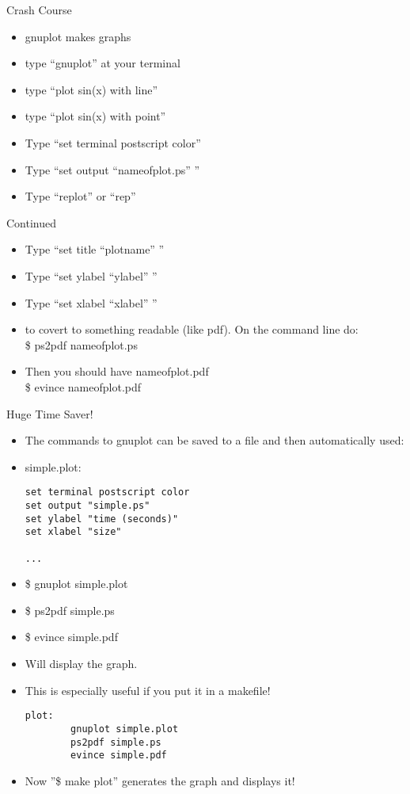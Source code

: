 \documentclass{beamer}
\begin{document}
\begin{frame}{Crash Course}
\begin{itemize}
\item gnuplot makes graphs
\item type ``gnuplot'' at your terminal 
\item type ``plot sin(x) with line''
\item type ``plot sin(x) with point''

\item Type ``set terminal postscript color''
\item Type ``set output ``nameofplot.ps'' ''
\item Type ``replot'' or ``rep''
\end{itemize}
\end{frame}

\begin{frame}{Continued}
\begin{itemize}
\item Type ``set title ``plotname'' ''
\item Type ``set ylabel ``ylabel'' ''                                    
\item Type ``set xlabel ``xlabel'' ''

\item to covert to something readable (like pdf).  On the command line do:\\
\$ ps2pdf nameofplot.ps
\item Then you should have nameofplot.pdf \\
\$ evince nameofplot.pdf
\end{itemize}
\end{frame}

\begin{frame}[fragile]{Huge Time Saver!}
\begin{itemize}
\item The commands to gnuplot can be saved to a file and then automatically used:
\item simple.plot:\\
\begin{lstlisting}
set terminal postscript color
set output "simple.ps"
set ylabel "time (seconds)"
set xlabel "size"

...
\end{lstlisting}
\item \$ gnuplot simple.plot
\item \$ ps2pdf simple.ps
\item \$ evince simple.pdf
\item Will display the graph.
\item This is especially useful if you put it in a makefile!
\begin{lstlisting}
plot:
        gnuplot simple.plot
        ps2pdf simple.ps
        evince simple.pdf
\end{lstlisting}
\item Now ''\$ make plot'' generates the graph and displays it!
\end{itemize}
\end{frame}
\end{document}
